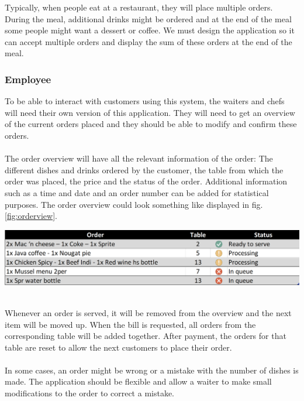 \documentclass[12pt]{article}
\newenvironment{Figure}
	{\par\medskip\noindent\minipage{\linewidth}}
	{\endminipage\par\medskip}
\begin{document}
\begin{multicols}{2}
\noindent
Typically, when people eat at a restaurant, they will place multiple orders. During the meal, additional drinks might be ordered and at the end of the meal some people might want a dessert or coffee. We must design the application so it can accept multiple orders and display the sum of these orders at the end of the meal.


\subsubsection{Employee}
To be able to interact with customers using this system, the waiters and chefs will need their own version of this application. They will need to get an overview of the current orders placed and they should be able to modify and confirm these orders.
\\\\
The order overview will have all the relevant information of the order: The different dishes and drinks ordered by the customer, the table from which the order was placed, the price and the status of the order. Additional information such as a time and date and an order number can be added for statistical purposes.
The order overview could look something like displayed in fig. \ref{fig:orderview}.
\begin{Figure}
	\includegraphics[width=\linewidth]{illustrations/orderview.PNG}
	\label{fig:orderview}
\end{Figure}
\noindent \\Whenever an order is served, it will be removed from the overview and the next item will be moved up. When the bill is requested, all orders from the corresponding table will be added together. After payment, the orders for that table are reset to allow the next customers to place their order.
\\\\
In some cases, an order might be wrong or a mistake with the number of dishes is made. The application should be flexible and allow a waiter to make small modifications to the order to correct a mistake.

\end{multicols}
\end{document}
